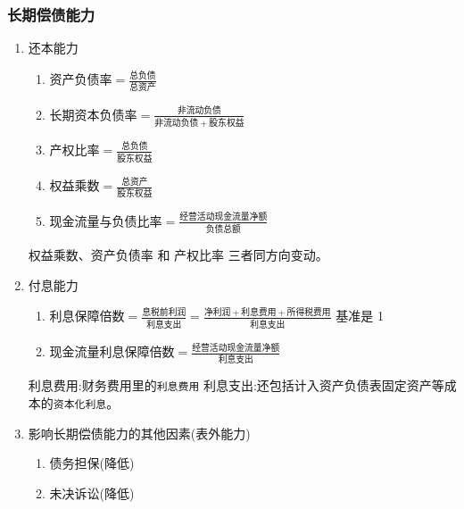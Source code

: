 \documentclass[11pt]{article}
\begin{document}
\subsubsection{长期偿债能力}
\label{sec:org9230ce8}
\begin{enumerate}
\item 还本能力
\label{sec:orgb708b58}
\begin{enumerate}
\item \(资产负债率 = \frac{总负债}{总资产}\)
\item \(长期资本负债率 = \frac{非流动负债}{非流动负债 + 股东权益}\)
\item \(产权比率 = \frac{总负债}{股东权益}\)
\item \(权益乘数 = \frac{总资产}{股东权益}\)
\item \(现金流量与负债比率 = \frac{经营活动现金流量净额}{负债总额}\)
\end{enumerate}
权益乘数、资产负债率 和 产权比率 三者同方向变动。
\item 付息能力
\label{sec:org3f01864}
\begin{enumerate}
\item \(利息保障倍数 = \frac{息税前利润}{利息支出} = \frac{净利润 + 利息费用 + 所得税费用}{利息支出}\)
基准是 1
\item \(现金流量利息保障倍数 = \frac{经营活动现金流量净额}{利息支出}\)
\end{enumerate}
利息费用:财务费用里的\texttt{利息费用}
利息支出:还包括计入资产负债表固定资产等成本的\texttt{资本化利息}。
\item 影响长期偿债能力的其他因素(表外能力)
\label{sec:orgfccecd6}
\begin{enumerate}
\item 债务担保(降低)
\item 未决诉讼(降低)
\end{enumerate}
\end{enumerate}
\end{document}
